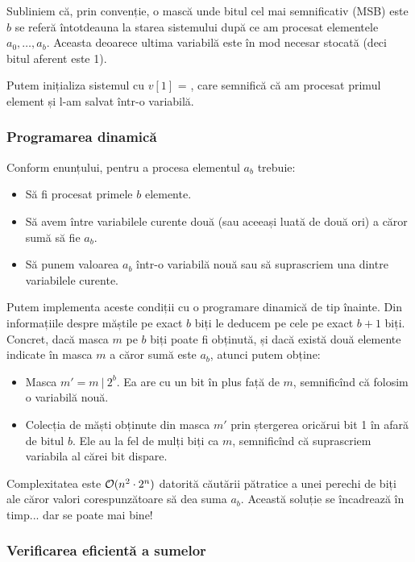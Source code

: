 \documentclass[../main.tex]{subfiles}
\begin{document}
Subliniem că, prin convenție, o mască unde bitul cel mai semnificativ (MSB) este $b$ se referă întotdeauna la starea sistemului după ce am procesat elementele $a_0, \dots, a_b$. Aceasta deoarece ultima variabilă este în mod necesar stocată (deci bitul aferent este 1).

Putem inițializa sistemul cu $v[1]$ = , care semnifică că am procesat primul element și l-am salvat într-o variabilă.

\subsubsection*{Programarea dinamică}

Conform enunțului, pentru a procesa elementul $a_b$ trebuie:

\begin{itemize}
  \item Să fi procesat primele $b$ elemente.
  \item Să avem între variabilele curente două (sau aceeași luată de două ori) a căror sumă să fie $a_b$.
  \item Să punem valoarea $a_b$ într-o variabilă nouă sau să suprascriem una dintre variabilele curente.
\end{itemize}

Putem implementa aceste condiții cu o programare dinamică de tip înainte. Din informațiile despre măștile pe exact $b$ biți le deducem pe cele pe exact $b+1$ biți. Concret, dacă masca $m$ pe $b$ biți poate fi obținută, și dacă există două elemente indicate în masca $m$ a căror sumă este $a_b$, atunci putem obține:

\begin{itemize}
  \item Masca $m' = m \ | \ 2^b$. Ea are cu un bit în plus față de $m$, semnificînd că folosim o variabilă nouă.

  \item Colecția de măști obținute din masca $m'$ prin ștergerea oricărui bit 1 în afară de bitul $b$. Ele au la fel de mulți biți ca $m$, semnificînd că suprascriem variabila al cărei bit dispare.
\end{itemize}

Complexitatea este $\mathcal{O}(n^2 \cdot 2^n)$ datorită căutării pătratice a unei perechi de biți ale căror valori corespunzătoare să dea suma $a_b$. Această soluție se încadrează în timp... dar se poate mai bine!

\subsubsection*{Verificarea eficientă a sumelor}
\end{document}
